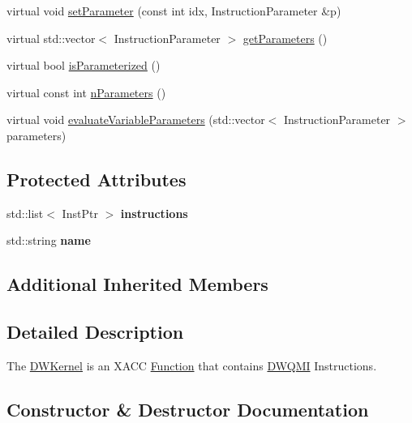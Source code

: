 \begin{DoxyCompactItemize}
virtual void \hyperlink{a01221_adf89cdd1f54e183c4cff36b338b2be8d}{set\+Parameter} (const int idx, Instruction\+Parameter \&p)
\item 
virtual std\+::vector$<$ Instruction\+Parameter $>$ \hyperlink{a01221_a829462cff34e2257da06afd8a2051a8e}{get\+Parameters} ()
\item 
virtual bool \hyperlink{a01221_a8957ea368244ed4a4ebd85f6bfecb785}{is\+Parameterized} ()
\item 
virtual const int \hyperlink{a01221_a029429948329b94c1d89f32cf5c486d4}{n\+Parameters} ()
\item 
virtual void \hyperlink{a01221_a09ffac417d4ecbbd82d7a680ad8dfcce}{evaluate\+Variable\+Parameters} (std\+::vector$<$ Instruction\+Parameter $>$ parameters)
\end{DoxyCompactItemize}
\subsection*{Protected Attributes}
\begin{DoxyCompactItemize}
\item 
\mbox{\label{a01221_a38e434be6ef46a1ff43744632ae59ea8}} 
std\+::list$<$ Inst\+Ptr $>$ {\bfseries instructions}
\item 
\mbox{\label{a01221_a0df03f85cc3b8a4cd1a7fc839d4d303c}} 
std\+::string {\bfseries name}
\end{DoxyCompactItemize}
\subsection*{Additional Inherited Members}


\subsection{Detailed Description}
The \hyperlink{a01221}{D\+W\+Kernel} is an X\+A\+CC \hyperlink{a01653}{Function} that contains \hyperlink{a01225}{D\+W\+Q\+MI} Instructions. 

\subsection{Constructor \& Destructor Documentation}
\mbox{\label{a01221_a76a4dfadb973abbc93d1afefc6839ad8}} 
